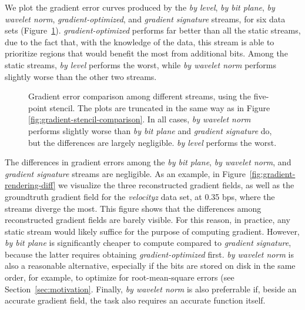 We plot the gradient error curves produced by the \emph{by level}, \emph{by bit plane}, \emph{by
wavelet norm}, \emph{gradient-optimized}, and \emph{gradient signature} streams, for six data sets
(Figure~\ref{fig:gradient-error-comparison}). \emph{gradient-optimized} performs far better than all
the static streams, due to the fact that, with the knowledge of the data, this stream is able to
prioritize regions that would benefit the most from additional bits. Among the static streams,
\emph{by level} performs the worst, while \emph{by wavelet norm} performs slightly worse than the
other two streams. 

\begin{figure}[h]
	\centering
	\caption{Gradient error comparison among different streams, using the five-point stencil. The
	plots are truncated in the same way as in Figure \ref{fig:gradient-stencil-comparison}. In all
	cases, \emph{by wavelet norm} performs slightly worse than \emph{by bit plane} and \emph{gradient
	signature} do, but the differences are largely negligible. \emph{by level} performs the worst.}
	\label{fig:gradient-error-comparison}
\end{figure}

The differences in gradient errors among the \emph{by bit plane}, \emph{by wavelet norm}, and
\emph{gradient signature} streams are negligible. As an example, in
Figure~\ref{fig:gradient-rendering-diff} we visualize the three reconstructed gradient fields, as
well as the groundtruth gradient field for the \emph{velocityz} data set, at 0.35 bps, where the
streams diverge the most. This figure shows that the differences among reconstructed gradient fields
are barely visible. For this reason, in practice, any static stream would likely suffice for the
purpose of computing gradient. However, \emph{by bit plane} is significantly cheaper to compute
compared to \emph{gradient signature}, because the latter requires obtaining
\emph{gradient-optimized} first. \emph{by wavelet norm} is also a reasonable alternative, especially
if the bits are stored on disk in the same order, for example, to optimize for root-mean-square
errors (see Section~\ref{sec:motivation}. Finally, \emph{by wavelet norm} is also preferrable if,
beside an accurate gradient field, the task also requires an accurate function itself.

